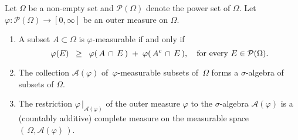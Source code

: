 \begin{theorem}
\mbox{}
\vskip 0.1cm
\noindent
Let $\Omega$ be a non-empty set and $\mathcal{P}(\Omega)$ denote the power set of $\Omega$.
Let $\varphi : \mathcal{P}(\Omega) \longrightarrow [0,\infty]$ be an outer measure on $\Omega$.
\begin{enumerate}
\item	A subset $A \subset \Omega$ is $\varphi$-measurable if and only if
		\begin{equation*}
		\varphi(E) \;\;\geq\;\; \varphi(\,A \,\cap\, E\,) \;+\; \varphi(\,A^{c}\,\cap\, E\,),
		\quad
		\textnormal{for every $E \in \mathcal{P}(\Omega)$}.
		\end{equation*}
\item	The collection $\mathcal{A}(\varphi)$ of \,$\varphi$-measurable subsets of \,$\Omega$
		forms a $\sigma$-algebra of subsets of $\Omega$.
\item	The restriction $\varphi\,\vert_{\mathcal{A}(\varphi)}$ of the outer measure $\varphi$ to the
		$\sigma$-algebra $\mathcal{A}(\varphi)$ is a (countably additive) complete measure on
		the measurable space $\left(\,\Omega,\mathcal{A}(\varphi)\,\right)$.
\end{enumerate}
\end{theorem}

